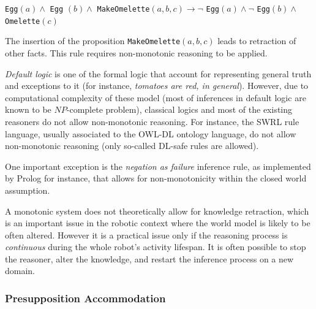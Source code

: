 \documentclass[a4paper, twocolumn]{article}
\newcommand{\concept}[1]{{\footnotesize \texttt{#1}}}
\begin{document}
\concept{Egg}$(a) \land $ \concept{Egg} $(b) \land $
\concept{MakeOmelette}$(a, b, c) \to \lnot $ \concept{Egg}$(a) \land \lnot $
\concept{Egg}$(b) \land $ \concept{Omelette}$(c)$

The insertion of the proposition \concept{MakeOmelette}$(a, b, c)$ leads to
retraction of other facts. This rule requires non-monotonic reasoning to be
applied.

\emph{Default logic} is one of the formal logic that account for representing
general truth and exceptions to it (for instance, \emph{tomatoes are red, in
general}). However, due to computational complexity of these model (most of
inferences in default logic are known to be $NP$-complete problem), classical
logics and most of the existing reasoners do not allow non-monotonic reasoning.
For instance, the SWRL rule language, usually associated to the OWL-DL ontology
language, do not allow non-monotonic reasoning (only so-called DL-safe rules
are allowed).


One important exception is the \emph{negation as failure} inference rule, as
implemented by {\sc Prolog} for instance, that allows for non-monotonicity
within the closed world assumption.


A monotonic system does not theoretically allow for knowledge retraction,
which is an important issue in the robotic context where the world model is
likely to be often altered.  However it is a practical issue only if the
reasoning process is \emph{continuous} during the whole robot's activity
lifespan. It is often possible to stop the reasoner, alter the knowledge, and
restart the inference process on a new domain.



\subsubsection{Presupposition Accommodation}
\label{sect|presupposition-accommodation}
\end{document}
